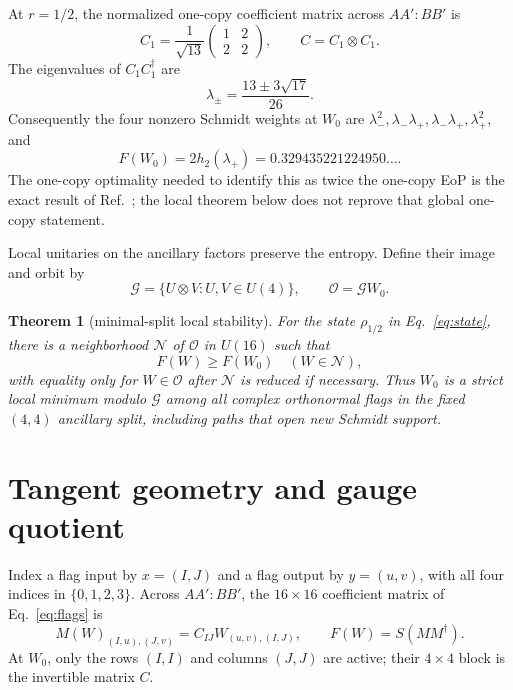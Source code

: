 \documentclass[11pt]{article}
\newtheorem{theorem}{Theorem}
\newcommand{\cG}{\mathcal{G}}
\newcommand{\cO}{\mathcal{O}}
\begin{document}
At $r=1/2$, the normalized one-copy coefficient matrix across $AA':BB'$ is
\begin{equation}
 C_1=\frac{1}{\sqrt{13}}
 \begin{pmatrix}1&2\\2&2\end{pmatrix},\qquad C=C_1\otimes C_1.
 \label{eq:C}
\end{equation}
The eigenvalues of $C_1C_1^\dagger$ are
\begin{equation}
 \lambda_{\pm}=\frac{13\pm3\sqrt{17}}{26}.
 \label{eq:lambdapm}
\end{equation}
Consequently the four nonzero Schmidt weights at $W_0$ are
$\lambda_-^2,\lambda_-\lambda_+,\lambda_-\lambda_+,\lambda_+^2$, and
\begin{equation}
 F(W_0)=2h_2(\lambda_+)=0.329435221224950\ldots .
 \label{eq:F0}
\end{equation}
The one-copy optimality needed to identify this as twice the one-copy EoP is
the exact result of Ref.~\cite{NegariKhanian2026}; the local theorem below
does not reprove that global one-copy statement.

Local unitaries on the ancillary factors preserve the entropy.  Define their
image and orbit by
\begin{equation}
 \cG=\{U\otimes V:U,V\in U(4)\},\qquad \cO=\cG W_0.
 \label{eq:gauge}
\end{equation}

\begin{theorem}[minimal-split local stability]
\label{thm:main}
For the state $\rho_{1/2}$ in Eq.~\eqref{eq:state}, there is a neighborhood
$\mathcal N$ of $\cO$ in $U(16)$ such that
\begin{equation}
 F(W)\geq F(W_0)\quad (W\in\mathcal N),
\end{equation}
with equality only for $W\in\cO$ after $\mathcal N$ is reduced if necessary.
Thus $W_0$ is a strict local minimum modulo $\cG$ among all complex
orthonormal flags in the fixed $(4,4)$ ancillary split, including paths that
open new Schmidt support.
\end{theorem}

\section{Tangent geometry and gauge quotient}

Index a flag input by $x=(I,J)$ and a flag output by $y=(u,v)$, with all four
indices in $\{0,1,2,3\}$.  Across $AA':BB'$, the $16\times16$ coefficient
matrix of Eq.~\eqref{eq:flags} is
\begin{equation}
 M(W)_{(I,u),(J,v)}=C_{IJ}W_{(u,v),(I,J)},\qquad F(W)=S(MM^\dagger).
 \label{eq:Mmap}
\end{equation}
At $W_0$, only the rows $(I,I)$ and columns $(J,J)$ are active; their
$4\times4$ block is the invertible matrix $C$.
\end{document}
